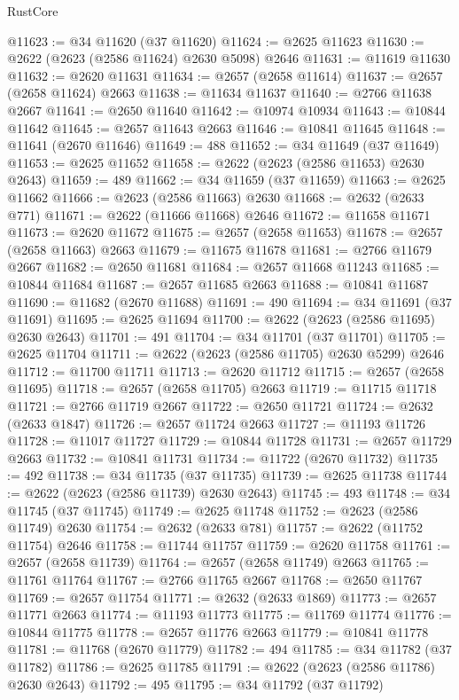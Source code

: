 \begin{lexlean}{RustCore}
\begin{coremodule}
@11623 := @34 @11620 (@37 @11620)
@11624 := @2625 @11623
@11630 := @2622 (@2623 (@2586 @11624) @2630 @5098) @2646
@11631 := @11619 @11630
@11632 := @2620 @11631
@11634 := @2657 (@2658 @11614)
@11637 := @2657 (@2658 @11624) @2663
@11638 := @11634 @11637
@11640 := @2766 @11638 @2667
@11641 := @2650 @11640
@11642 := @10974 @10934
@11643 := @10844 @11642
@11645 := @2657 @11643 @2663
@11646 := @10841 @11645
@11648 := @11641 (@2670 @11646)
@11649 := 488
@11652 := @34 @11649 (@37 @11649)
@11653 := @2625 @11652
@11658 := @2622 (@2623 (@2586 @11653) @2630 @2643)
@11659 := 489
@11662 := @34 @11659 (@37 @11659)
@11663 := @2625 @11662
@11666 := @2623 (@2586 @11663) @2630
@11668 := @2632 (@2633 @771)
@11671 := @2622 (@11666 @11668) @2646
@11672 := @11658 @11671
@11673 := @2620 @11672
@11675 := @2657 (@2658 @11653)
@11678 := @2657 (@2658 @11663) @2663
@11679 := @11675 @11678
@11681 := @2766 @11679 @2667
@11682 := @2650 @11681
@11684 := @2657 @11668 @11243
@11685 := @10844 @11684
@11687 := @2657 @11685 @2663
@11688 := @10841 @11687
@11690 := @11682 (@2670 @11688)
@11691 := 490
@11694 := @34 @11691 (@37 @11691)
@11695 := @2625 @11694
@11700 := @2622 (@2623 (@2586 @11695) @2630 @2643)
@11701 := 491
@11704 := @34 @11701 (@37 @11701)
@11705 := @2625 @11704
@11711 := @2622 (@2623 (@2586 @11705) @2630 @5299) @2646
@11712 := @11700 @11711
@11713 := @2620 @11712
@11715 := @2657 (@2658 @11695)
@11718 := @2657 (@2658 @11705) @2663
@11719 := @11715 @11718
@11721 := @2766 @11719 @2667
@11722 := @2650 @11721
@11724 := @2632 (@2633 @1847)
@11726 := @2657 @11724 @2663
@11727 := @11193 @11726
@11728 := @11017 @11727
@11729 := @10844 @11728
@11731 := @2657 @11729 @2663
@11732 := @10841 @11731
@11734 := @11722 (@2670 @11732)
@11735 := 492
@11738 := @34 @11735 (@37 @11735)
@11739 := @2625 @11738
@11744 := @2622 (@2623 (@2586 @11739) @2630 @2643)
@11745 := 493
@11748 := @34 @11745 (@37 @11745)
@11749 := @2625 @11748
@11752 := @2623 (@2586 @11749) @2630
@11754 := @2632 (@2633 @781)
@11757 := @2622 (@11752 @11754) @2646
@11758 := @11744 @11757
@11759 := @2620 @11758
@11761 := @2657 (@2658 @11739)
@11764 := @2657 (@2658 @11749) @2663
@11765 := @11761 @11764
@11767 := @2766 @11765 @2667
@11768 := @2650 @11767
@11769 := @2657 @11754
@11771 := @2632 (@2633 @1869)
@11773 := @2657 @11771 @2663
@11774 := @11193 @11773
@11775 := @11769 @11774
@11776 := @10844 @11775
@11778 := @2657 @11776 @2663
@11779 := @10841 @11778
@11781 := @11768 (@2670 @11779)
@11782 := 494
@11785 := @34 @11782 (@37 @11782)
@11786 := @2625 @11785
@11791 := @2622 (@2623 (@2586 @11786) @2630 @2643)
@11792 := 495
@11795 := @34 @11792 (@37 @11792)

\end{coremodule}
\end{lexlean}
